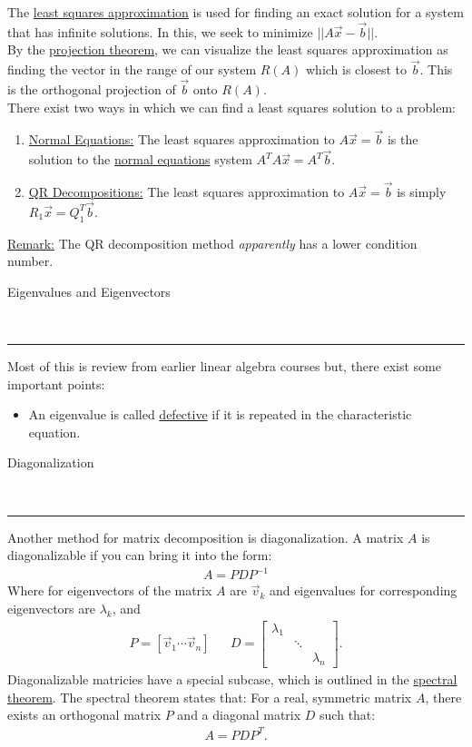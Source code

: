 \documentclass{article}
\newcommand{\header}[1]{\begin{large}\noindent #1\end{large}\\\rule{\textwidth}{0.5pt}}
\newcommand{\gap}{\medskip\\}
\newcommand{\sheader}[1]{\underline{#1:}}
\begin{document}
The \underline{least squares approximation} is used for finding an exact solution 
for a system that has infinite solutions. In this, we seek to minimize $||A\vec{x} - \vec{b}||$.
\gap
By the \underline{projection theorem}, we can visualize the least squares approximation
as finding the vector in the range of our system $R(A)$ which is closest to $\vec{b}$.
This is the orthogonal projection of $\vec{b}$ onto $R(A)$.
\gap
There exist two ways in which we can find a least squares solution to a problem:
\begin{enumerate}
    \item \sheader{Normal Equations} The least squares approximation to $A\vec{x} = \vec{b}$
    is the solution to the \underline{normal equations} system $A^TA\vec{x} = A^T \vec{b}$.
    \item \sheader{QR Decompositions} The least squares approximation to $A\vec{x} = \vec{b}$
    is simply $R_1\vec{x} = Q_1^T\vec{b}$.
\end{enumerate}
\sheader{Remark} The QR decomposition method \textit{apparently} has a lower condition number.
\gap
\header{Eigenvalues and Eigenvectors}
Most of this is review from earlier linear algebra courses but, there exist some 
important points:
\begin{itemize}
    \item An eigenvalue is called \underline{defective} if it is repeated in 
    the characteristic equation.
\end{itemize}
\pagebreak
\header{Diagonalization}
Another method for matrix decomposition is diagonalization. A matrix $A$ is diagonalizable
if you can bring it into the form:
\begin{align*}
    A = PDP^{-1}
\end{align*}
Where for eigenvectors of the matrix $A$ are $\vec{v}_k$ and eigenvalues for corresponding
eigenvectors are $\lambda_k$, and
\begin{align*}
    P = [\vec{v}_1 \cdots \vec{v}_n] && D = \begin{bmatrix}
        \lambda_1 & & \\
         & \ddots & \\
        & & \lambda_n
    \end{bmatrix}.
\end{align*}
Diagonalizable matricies have a special subcase, which is outlined in the
\underline{spectral theorem}. The spectral theorem states that:
For a real, symmetric matrix $A$, there exists an orthogonal matrix $P$ and a 
diagonal matrix $D$ such that:
\begin{align*}
    A = PDP^T.
\end{align*}
\end{document}
